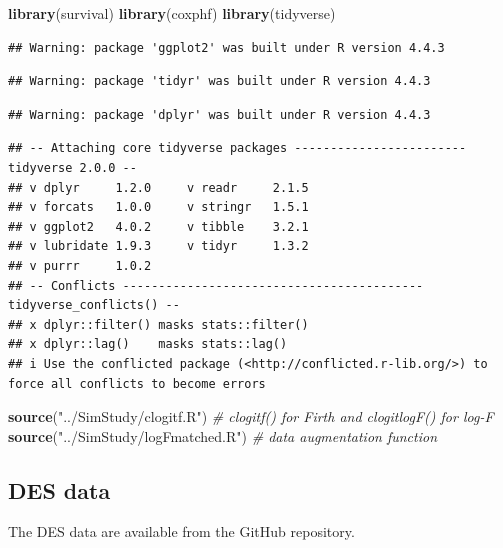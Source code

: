 \documentclass[
]{article}
\newenvironment{Shaded}{\begin{snugshade}}{\end{snugshade}}
\newcommand{\CommentTok}[1]{\textcolor[rgb]{0.56,0.35,0.01}{\textit{#1}}}
\newcommand{\FunctionTok}[1]{\textcolor[rgb]{0.13,0.29,0.53}{\textbf{#1}}}
\newcommand{\NormalTok}[1]{#1}
\newcommand{\StringTok}[1]{\textcolor[rgb]{0.31,0.60,0.02}{#1}}
\begin{document}
\begin{Shaded}
\begin{Highlighting}[]
\FunctionTok{library}\NormalTok{(survival)}
\FunctionTok{library}\NormalTok{(coxphf)}
\FunctionTok{library}\NormalTok{(tidyverse)}
\end{Highlighting}
\end{Shaded}

\begin{verbatim}
## Warning: package 'ggplot2' was built under R version 4.4.3
\end{verbatim}

\begin{verbatim}
## Warning: package 'tidyr' was built under R version 4.4.3
\end{verbatim}

\begin{verbatim}
## Warning: package 'dplyr' was built under R version 4.4.3
\end{verbatim}

\begin{verbatim}
## -- Attaching core tidyverse packages ------------------------ tidyverse 2.0.0 --
## v dplyr     1.2.0     v readr     2.1.5
## v forcats   1.0.0     v stringr   1.5.1
## v ggplot2   4.0.2     v tibble    3.2.1
## v lubridate 1.9.3     v tidyr     1.3.2
## v purrr     1.0.2     
## -- Conflicts ------------------------------------------ tidyverse_conflicts() --
## x dplyr::filter() masks stats::filter()
## x dplyr::lag()    masks stats::lag()
## i Use the conflicted package (<http://conflicted.r-lib.org/>) to force all conflicts to become errors
\end{verbatim}

\begin{Shaded}
\begin{Highlighting}[]
\FunctionTok{source}\NormalTok{(}\StringTok{"../SimStudy/clogitf.R"}\NormalTok{) }\CommentTok{\# clogitf() for Firth and clogitlogF() for log{-}F}
\FunctionTok{source}\NormalTok{(}\StringTok{"../SimStudy/logFmatched.R"}\NormalTok{) }\CommentTok{\# data augmentation function }
\end{Highlighting}
\end{Shaded}

\subsection{DES data}\label{des-data}

The DES data are available from the GitHub repository.
\end{document}
